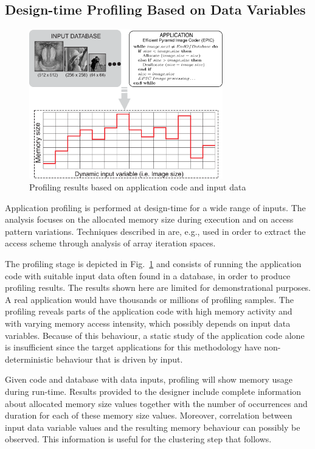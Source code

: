 \documentclass[smallextended]{svjour3}
\begin{document}
\subsection{Design-time Profiling Based on Data Variables}

\begin{figure}
\centering
\includegraphics[width=0.75\textwidth]{Images/profiling2.eps}
\caption{Profiling results based on application code and input data}
\label{fig:profiling}
\end{figure}

Application profiling is performed at design-time for a wide range of inputs. 
The analysis focuses on the allocated memory size during execution and on access pattern variations. 
Techniques described in \cite{Ang13b} are, e.g., used in order to extract the access scheme through analysis of array iteration spaces.  

The profiling stage is depicted in Fig.~\ref{fig:profiling} and consists of running the application code with suitable input data often found in a database, in order to produce profiling results. 
The results shown here are limited for demonstrational purposes. 
A real application would have thousands or millions of profiling samples. 
The profiling reveals parts of the application code with high memory activity and with varying memory access intensity, which possibly depends on input data variables. 
Because of this behaviour, a static study of the application code alone is insufficient since the target applications for this methodology have non-deterministic behaviour that is driven by input.

Given code and database with data inputs, profiling will show memory usage during run-time.
Results provided to the designer include complete information about allocated memory size values together with the number of occurrences and duration for each of these memory size values. 
Moreover, correlation between input data variable values and the resulting memory behaviour can possibly be observed. This information is useful for the clustering step that follows. 
\end{document}
